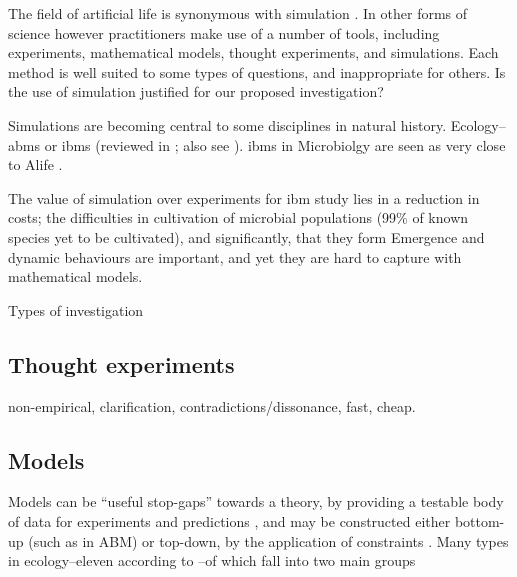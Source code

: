 
The field of artificial life is synonymous with simulation
\autocite[chap.2]{Aicardi2010}. In other forms of science however
practitioners make use of a number of tools, including experiments,
mathematical models, thought experiments, and simulations.
Each method is well suited to some types of
questions, and inappropriate for others. Is the use of simulation
justified for our proposed investigation?

Simulations are becoming central to some disciplines in natural history.
Ecology--\glspl{abm} or \glspl{ibm} (reviewed in
\autocite{DeAngelis2005}; also see
\autocite{Grimm:2006fk,Grimm:2005wd,Grimm:1999kf,Hogeweg:1990jz}).
\glspl{ibm} in Microbiolgy are seen as very close to Alife \autocite{Grimm:2009th}.

The value of simulation over experiments for
\gls{ibm} study lies in a reduction in costs; the difficulties in
cultivation of microbial populations (99\% of known species yet to be
cultivated), and significantly, that they form  Emergence and
dynamic behaviours are important, and yet they are hard to capture with
mathematical models.

Types of investigation

\subsection{Thought experiments}\label{thought-experiments}

non-empirical, clarification, contradictions/dissonance, fast, cheap.

\subsection{Models}\label{models}


Models can be ``useful stop-gaps'' towards a theory, by providing a
testable body of data for experiments and predictions
\autocite{Krakauer2011}, and may be constructed either bottom-up (such
as in ABM) or top-down, by the application of constraints
\autocite{Krakauer2011}. Many types in \eg ecology--eleven according to
\autocite{Jorgensen2008}--of which fall into two main groups


